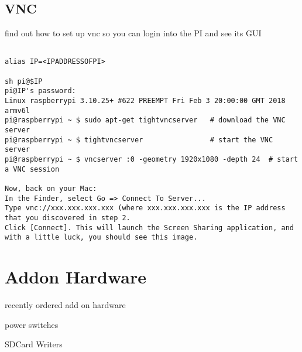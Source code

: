 \subsection{VNC}

\begin{exercise}
find out how to set up vnc so you can login into the PI and see its GUI
\end{exercise}


\begin{lstlisting}

alias IP=<IPADDRESSOFPI>

sh pi@$IP
pi@IP's password: 
Linux raspberrypi 3.10.25+ #622 PREEMPT Fri Feb 3 20:00:00 GMT 2018 armv6l
pi@raspberrypi ~ $ sudo apt-get tightvncserver   # download the VNC server
pi@raspberrypi ~ $ tightvncserver                # start the VNC server
pi@raspberrypi ~ $ vncserver :0 -geometry 1920x1080 -depth 24  # start a VNC session

Now, back on your Mac:
In the Finder, select Go => Connect To Server...
Type vnc://xxx.xxx.xxx.xxx (where xxx.xxx.xxx.xxx is the IP address that you discovered in step 2.
Click [Connect]. This will launch the Screen Sharing application, and
with a little luck, you should see this image.
\end{lstlisting}

\section{Addon Hardware}

recently ordered add on hardware

power switches


SDCard Writers



